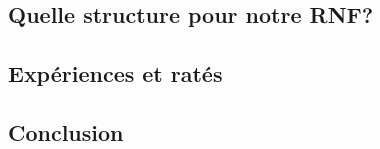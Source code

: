 \subsection{Quelle structure pour notre RNF?}
\subsection{Exp\'eriences et rat\'es}
\subsection{Conclusion}

